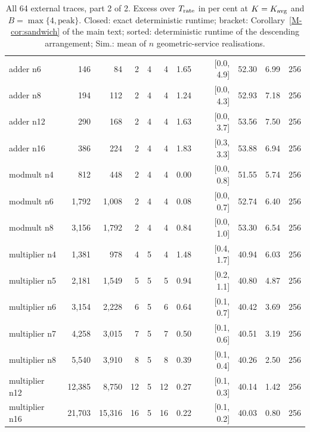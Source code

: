 \begin{table}[htbp]
\begin{tabular}{lrrrrrrrrrr}
adder n6 & 146 & 84 & 2 & 4 & 4 & 1.65 & [0.0, 4.9] & 52.30 & 6.99 & 256\\
adder n8 & 194 & 112 & 2 & 4 & 4 & 1.24 & [0.0, 4.3] & 52.93 & 7.18 & 256\\
adder n12 & 290 & 168 & 2 & 4 & 4 & 1.63 & [0.0, 3.7] & 53.56 & 7.50 & 256\\
adder n16 & 386 & 224 & 2 & 4 & 4 & 1.83 & [0.3, 3.3] & 53.88 & 6.94 & 256\\
modmult n4 & 812 & 448 & 2 & 4 & 4 & 0.00 & [0.0, 0.8] & 51.55 & 5.74 & 256\\
modmult n6 & 1,792 & 1,008 & 2 & 4 & 4 & 0.08 & [0.0, 0.7] & 52.74 & 6.40 & 256\\
modmult n8 & 3,156 & 1,792 & 2 & 4 & 4 & 0.84 & [0.0, 1.0] & 53.30 & 6.54 & 256\\
multiplier n4 & 1,381 & 978 & 4 & 5 & 4 & 1.48 & [0.4, 1.7] & 40.94 & 6.03 & 256\\
multiplier n5 & 2,181 & 1,549 & 5 & 5 & 5 & 0.94 & [0.2, 1.1] & 40.80 & 4.87 & 256\\
multiplier n6 & 3,154 & 2,228 & 6 & 5 & 6 & 0.64 & [0.1, 0.7] & 40.42 & 3.69 & 256\\
multiplier n7 & 4,258 & 3,015 & 7 & 5 & 7 & 0.50 & [0.1, 0.6] & 40.51 & 3.19 & 256\\
multiplier n8 & 5,540 & 3,910 & 8 & 5 & 8 & 0.39 & [0.1, 0.4] & 40.26 & 2.50 & 256\\
multiplier n12 & 12,385 & 8,750 & 12 & 5 & 12 & 0.27 & [0.1, 0.3] & 40.14 & 1.42 & 256\\
multiplier n16 & 21,703 & 15,316 & 16 & 5 & 16 & 0.22 & [0.1, 0.2] & 40.03 & 0.80 & 256\\
\bottomrule
\end{tabular}
\caption{All 64 external traces, part 2 of 2. Excess over $T_{\rm rate}$ in per cent at $K=K_{\rm avg}$ and $B=\max\{4,\text{peak}\}$. Closed: exact deterministic runtime; bracket: Corollary~\ref{M-cor:sandwich} of the main text; sorted: deterministic runtime of the descending arrangement; Sim.: mean of $n$ geometric-service realisations.}
\label{tab:externalall2}
\end{table}
